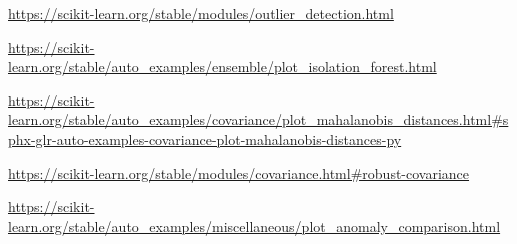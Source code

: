 \documentclass{article}
\begin{document}
\begin{thebibliography}{9}
    \url{https://scikit-learn.org/stable/modules/outlier_detection.html}

    \url{https://scikit-learn.org/stable/auto_examples/ensemble/plot_isolation_forest.html}

    \url{https://scikit-learn.org/stable/auto_examples/covariance/plot_mahalanobis_distances.html#sphx-glr-auto-examples-covariance-plot-mahalanobis-distances-py}

    \url{https://scikit-learn.org/stable/modules/covariance.html#robust-covariance}  

   
  \url{https://scikit-learn.org/stable/auto_examples/miscellaneous/plot_anomaly_comparison.html}
  
\end{thebibliography}
\end{document}
